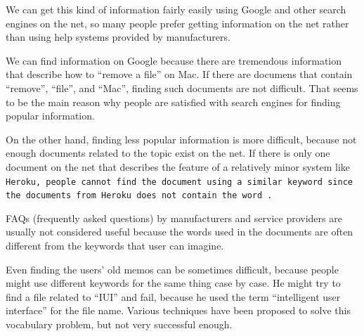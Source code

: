 \documentclass[manuscript,anonymous,review]{acmart}
\begin{document}
We can get this kind of information fairly easily using Google and other search engines on the net,
so many people prefer getting information on the net rather than
using help systems provided by manufacturers.

We can find information on Google because there are tremendous information
that describe how to ``remove a file'' on Mac.
If there are documens that contain ``remove'', ``file'', and ``Mac'',
finding such documents are not difficult.
That seems to be the main reason why people are satisfied with search engines
for finding popular information.



On the other hand,
finding less popular information is more difficult,
because not enough documents related to the topic exist on the net.
%
If there is only one document on the net
that describes the  feature of a relatively minor system like \tt{Heroku},
people cannot find the document using a similar keyword 
since the documents from \tt{Heroku} does not contain the word .



FAQs (frequently asked questions) by manufacturers and service providers are
usually not considered useful
because the words used in the documents are
often different from the keywords that user can imagine.


Even finding the users' old memos can be sometimes difficult,
because people might use different keywords for the same thing case by case.
He might try to find a file related to ``IUI'' and fail, because he used
the term ``intelligent user interface'' for the file name.
%
Various techniques have been proposed to solve this vocabulary problem\cite{Furnas:1987:VPH:32206.32212},
but not very successful enough.
\end{document}
